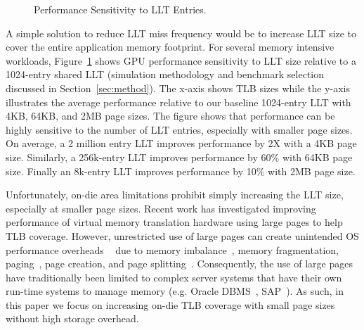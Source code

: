 \begin{figure}[t] 
\vspace{0. in}
\centering
\centerline{}

	\caption{\small Performance Sensitivity to LLT Entries. \normalsize}

\label{fig:tlb_sensitivity} 
\vspace{-0.15 in}
\end{figure}

A simple solution to reduce LLT miss frequency would be to increase
LLT size to cover the entire application memory footprint. For several
memory intensive workloads, Figure~\ref{fig:tlb_sensitivity} shows GPU
performance sensitivity to LLT size relative to a 1024-entry shared
LLT (simulation methodology and benchmark selection discussed in
Section~\ref{sec:method}). The x-axis shows TLB sizes while the y-axis
illustrates the average performance relative to our baseline
1024-entry LLT with 4KB, 64KB, and 2MB page sizes. The figure shows
that performance can be highly sensitive to the number of LLT entries,
especially with smaller page sizes. On average, a 2 million entry LLT
improves performance by 2X with a 4KB page size. Similarly, a
256k-entry LLT improves performance by 60\% with 64KB page size.
Finally an 8k-entry LLT improves performance by 10\% with 2MB page
size.

Unfortunately, on-die area limitations prohibit simply increasing the
LLT size, especially at smaller page sizes. Recent work has
investigated improving performance of virtual memory translation
hardware using large pages to help TLB coverage.
However, unrestricted use of large pages can create unintended OS
performance overheads ~\cite{SuperPageProblem, TwoPageSize} due to
memory imbalance~\cite{numa-harmful}, memory fragmentation,
paging~\cite{cameo}, page creation, and page
splitting~\cite{largepagevm}. Consequently, the use of large pages
have traditionally been limited to complex server systems that have
their own run-time systems to manage memory (e.g. Oracle
DBMS~\cite{oracle_dbms}, SAP~\cite{sap}). As such, in this paper we
focus on increasing on-die TLB coverage with small page sizes without
high storage overhead.

